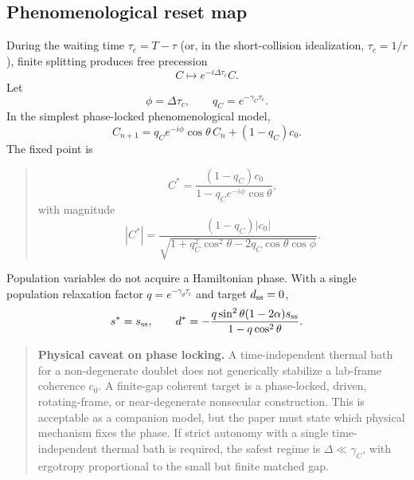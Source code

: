 \documentclass[11pt,a4paper]{article}
\newenvironment{resultbox}{\begin{quote}\small\color{blue!40!black}}{\end{quote}}
\newenvironment{notebox}{\begin{quote}\small}{\end{quote}}
\begin{document}
\subsection{Phenomenological reset map}

During the waiting time $\tau_c=T-\tau$ (or, in the short-collision idealization, $\tau_c=1/r$), finite splitting produces free precession
\begin{equation}
C\mapsto e^{-i\Delta\tau_c}C.
\end{equation}
Let
\begin{equation}
\phi=\Delta\tau_c,
\qquad
q_C=e^{-\gamma_C\tau_c}.
\end{equation}
In the simplest phase-locked phenomenological model,
\begin{equation}
C_{n+1}=q_C e^{-i\phi}\cos\theta\, C_n+(1-q_C)c_0.
\end{equation}
The fixed point is
\begin{resultbox}
\begin{equation}
C^*=\frac{(1-q_C)c_0}{1-q_C e^{-i\phi}\cos\theta},
\end{equation}
with magnitude
\begin{equation}
|C^*|=\frac{(1-q_C)|c_0|}{\sqrt{1+q_C^2\cos^2\theta-2q_C\cos\theta\cos\phi}}.
\end{equation}
\end{resultbox}

Population variables do not acquire a Hamiltonian phase. With a single population relaxation factor $q=e^{-\gamma_d\tau_c}$ and target $d_{\rm ss}=0$,
\begin{equation}
s^*=s_{\rm ss},
\qquad
d^*=-\frac{q\sin^2\theta(1-2\alpha)s_{\rm ss}}{1-q\cos^2\theta}.
\end{equation}

\begin{notebox}
\textbf{Physical caveat on phase locking.} A time-independent thermal bath for a non-degenerate doublet does not generically stabilize a lab-frame coherence $c_0$. A finite-gap coherent target is a phase-locked, driven, rotating-frame, or near-degenerate nonsecular construction. This is acceptable as a companion model, but the paper must state which physical mechanism fixes the phase. If strict autonomy with a single time-independent thermal bath is required, the safest regime is $\Delta\ll\gamma_C$, with ergotropy proportional to the small but finite matched gap.
\end{notebox}

\end{document}
